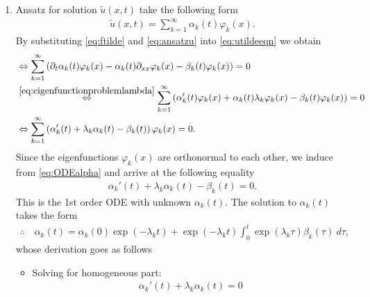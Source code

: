\documentclass[12pt]{article}
\begin{document}
\begin{enumerate}
	\item Ansatz for solution $\tilde{u}(x,t)$ take the following form
	      \begin{align}
		      \label{eq:ansatzu}
		      \tilde{u}(x,t) = \sum_{k=1}^\infty \alpha_k(t) \varphi_k(x).
	      \end{align}
	      By substituting \eqref{eq:ftilde} and \eqref{eq:ansatzu} into \eqref{eq:utildeeqn} we obtain 
	      \begin{align}
		      \label{eq:ODEalpha}
		       & \Leftrightarrow 
		      \sum_{k=1}^\infty 
		      \left(
		      \partial_t \alpha_{k}(t) \varphi_k(x)
		      - \alpha_k(t) \partial_{xx} \varphi_k(x)
		      - \beta_k(t) \varphi_k(x)
		      \right)
		      = 0             \notag                                               \\
		       & \stackrel{\eqref{eq:eigenfunctionproblemlambda}}{\Leftrightarrow}
		      \sum_{k=1}^\infty 
		      \left( 
		      \alpha_{k}'(t) \varphi_k(x)
		      + \alpha_k(t) \lambda_k \varphi_k(x)
		      - \beta_k(t) \varphi_k(x)
		      \right)              
		      = 0             \notag                                               \\
		       & \Leftrightarrow 
		      \sum_{k=1}^\infty 
		      \left( \alpha_{k}'(t)  + \lambda_k\alpha_k(t) - \beta_k(t) \right) \varphi_k(x)
		      = 0.
	      \end{align}
	      Since the eigenfunctions $\varphi_{k}(x)$ are orthonormal to each other, 
	      we induce from \eqref{eq:ODEalpha} and arrive at the following equality 
	      \begin{align}
		      \label{eq:ODEalphafinal}
		      \boxed{
			      \alpha_{k}'(t) + \lambda_k \alpha_k(t) - \beta_k(t) = 0.
		      }
	      \end{align}
	      This is the 1st order ODE with unknown $\alpha_{k}(t)$. 
	      The solution to $\alpha_k(t)$ takes the form
	      \begin{align*}
		      \therefore\quad
		      \boxed{
			      \alpha_k(t)
			      = \alpha_k(0) \exp(-\lambda_k t)
			      + \exp(-\lambda_k t) \int_0^t \exp(\lambda_k \tau) \beta_k(\tau) \ d\tau,
		      }
	      \end{align*}
	      whose derivation goes as follows
	      \begin{itemize}
		      \item Solving for homogeneous part:
		            \begin{align}
			            \alpha_{k}'(t) + \lambda_k \alpha_k(t) = 0 

\end{align}
\end{itemize}
\end{enumerate}
\end{document}
